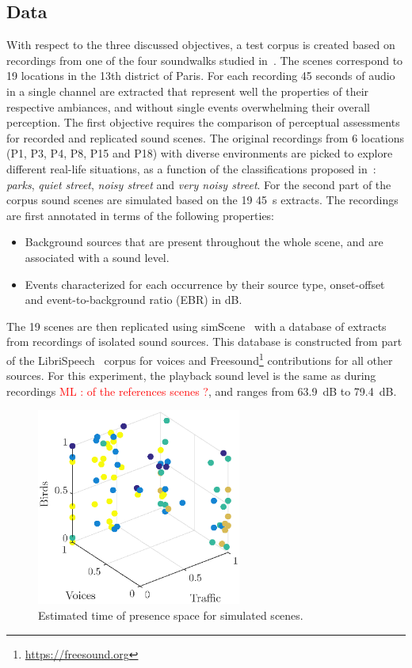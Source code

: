 \documentclass[11pt,a4paper]{article}
\newcommand{\ml}[1]{\textcolor{red}{ML : #1}}
\begin{document}
\subsection{Data}
\label{sec:test_data}

With respect to the three discussed objectives, a test corpus is created based on recordings from one of the four soundwalks studied in~\cite{aumond}. The scenes correspond to 19 locations in the 13th district of Paris. For each recording 45 seconds of audio in a single channel are extracted that represent well the properties of their respective ambiances, and without single events overwhelming their overall perception.
The first objective requires the comparison of perceptual assessments for recorded and replicated sound scenes. The original recordings from 6 locations (P1, P3, P4, P8, P15 and P18) with diverse environments are picked to explore different real-life situations, as a function of the classifications proposed in~\cite{jrg}: \textit{parks}, \textit{quiet street}, \textit{noisy street} and \textit{very noisy street}. For the second part of the corpus sound scenes are simulated based on the 19 45~s extracts. The recordings are first annotated in terms of the following properties:

\begin{itemize}
\item Background sources that are present throughout the whole scene, and are associated with a sound level.
\item Events characterized for each occurrence by their source type, onset-offset and event-to-background ratio (EBR) in dB.
\end{itemize}

The 19 scenes are then replicated using simScene~\cite{simscene} with a database of extracts from recordings of isolated sound sources. This database is constructed from part of the LibriSpeech~\cite{libri} corpus for voices and Freesound\footnote{\url{https://freesound.org}} contributions for all other sources. For this experiment, the playback sound level is the same as during recordings \ml{of the references scenes ?}, and ranges from 63.9~dB to 79.4~dB.\\

\begin{figure}[!h]
    \centering
    \includegraphics[width=0.6\textwidth]{figures/tvb_pres.eps}
    \caption{Estimated time of presence space for simulated scenes.}\label{fig:tvb_pres}
\end{figure}
\end{document}
